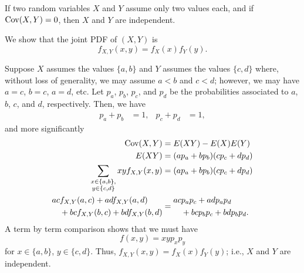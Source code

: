 \begin{problem}[Handout 15, \# 20]
  If two random variables \(X\) and \(Y\) assume only two values
  each, and if \(\operatorname{Cov}(X,Y)=0\), then \(X\) and \(Y\) are
  independent.
\end{problem}
\begin{solution}
  We show that the joint PDF of \((X,Y)\) is
  \[
    f_{X,Y}(x,y)=f_X(x)f_Y(y).
  \]

  Suppose \(X\) assumes the values \(\{a,b\}\) and \(Y\) assumes the values
  \(\{c,d\}\) where, without loss of generality, we may assume \(a<b\) and
  \(c<d\); however, we may have \(a=c\), \(b=c\), \(a=d\), etc. Let
  \(p_a\), \(p_b\), \(p_c\), and \(p_d\) be the probabilities associated to
  \(a\), \(b\), \(c\), and \(d\), respectively. Then, we have
  \[
    \begin{aligned}
      p_a+p_b&=1,&p_c+p_d&=1,
    \end{aligned}
  \]
  and more significantly
  \begin{align*}
    \operatorname{Cov}(X,Y)
    &=E(XY)-E(X)E(Y)\\
    E(XY)&=(ap_a+bp_b)(cp_c+dp_d)\\
    \sum_{\substack{x\in\{a,b\},\\ y\in\{c,d\}}}xy f_{X,Y}(x,y)
    &=(ap_a+bp_b)(cp_c+dp_d)\\
    \begin{aligned}
      ac&f_{X,Y}(a,c)+adf_{X,Y}(a,d)\\&+bcf_{X,Y}(b,c)+bdf_{X,Y}(b,d)
    \end{aligned}
    &=
      \begin{aligned}
        ac&p_ap_c+adp_ap_d\\&+bcp_bp_c+bdp_bp_d.
      \end{aligned}
  \end{align*}
  A term by term comparison shows that we must have
  \[
    f(x,y)=xyp_xp_y
  \]
  for \(x\in\{a,b\}\), \(y\in\{c,d\}\). Thus,
  \(f_{X,Y}(x,y)=f_X(x)f_Y(y)\); i.e., \(X\) and \(Y\) are independent.
\end{solution}


